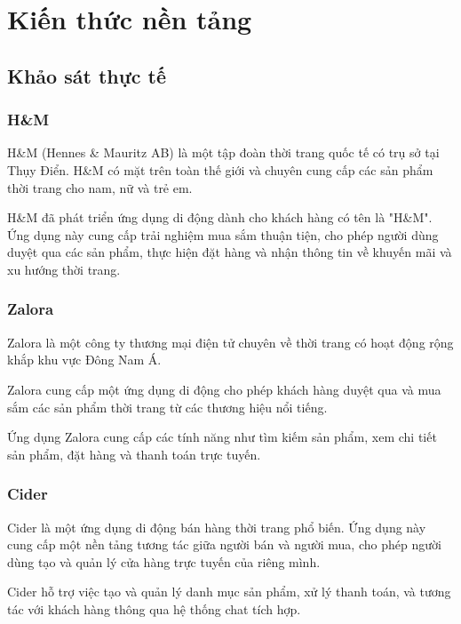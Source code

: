 \section{Kiến thức nền tảng}
\subsection{Khảo sát thực tế}
\subsubsection{H\&M}

\indent \indent H\&M (Hennes \& Mauritz AB) là một tập đoàn thời trang quốc tế có trụ sở tại Thụy Điển. H\&M có mặt trên toàn thế giới và chuyên cung cấp các sản phẩm thời trang cho nam, nữ và trẻ em.

H\&M đã phát triển ứng dụng di động dành cho khách hàng có tên là "H\&M". Ứng dụng này cung cấp trải nghiệm mua sắm thuận tiện, cho phép người dùng duyệt qua các sản phẩm, thực hiện đặt hàng và nhận thông tin về khuyến mãi và xu hướng thời trang.
\subsubsection{Zalora}
\indent \indent Zalora là một công ty thương mại điện tử chuyên về thời trang có hoạt động rộng khắp khu vực Đông Nam Á.

Zalora cung cấp một ứng dụng di động cho phép khách hàng duyệt qua và mua sắm các sản phẩm thời trang từ các thương hiệu nổi tiếng.

Ứng dụng Zalora cung cấp các tính năng như tìm kiếm sản phẩm, xem chi tiết sản phẩm, đặt hàng và thanh toán trực tuyến.
\subsubsection{Cider}
\indent \indent Cider là một ứng dụng di động bán hàng thời trang phổ biến. Ứng dụng này cung cấp một nền tảng tương tác giữa người bán và người mua, cho phép người dùng tạo và quản lý cửa hàng trực tuyến của riêng mình.

Cider hỗ trợ việc tạo và quản lý danh mục sản phẩm, xử lý thanh toán, và tương tác với khách hàng thông qua hệ thống chat tích hợp.

